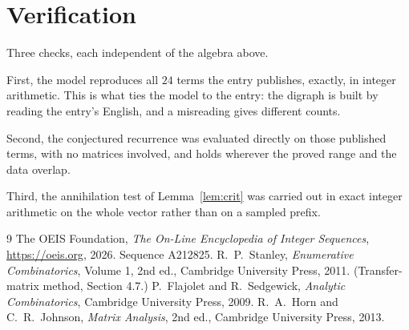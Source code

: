 \documentclass[11pt,a4paper]{article}
\theoremstyle{plain}
\theoremstyle{definition}
\begin{document}
\section{Verification}

Three checks, each independent of the algebra above.

First, the model reproduces all $24$ terms the entry publishes, exactly, in integer
arithmetic. This is what ties the model to the entry: the digraph is built by reading the
entry's English, and a misreading gives different counts.

Second, the conjectured recurrence was evaluated directly on those published terms, with no
matrices involved, and holds wherever the proved range and the data overlap.

Third, the annihilation test of Lemma~\ref{lem:crit} was carried out in exact integer
arithmetic on the whole vector rather than on a sampled prefix.

\begin{thebibliography}{9}
 The OEIS Foundation, \emph{The On-Line Encyclopedia of Integer
Sequences}, \url{https://oeis.org}, 2026. Sequence A212825.
 R.~P.~Stanley, \emph{Enumerative Combinatorics}, Volume 1, 2nd ed.,
Cambridge University Press, 2011. (Transfer-matrix method, Section 4.7.)
 P.~Flajolet and R.~Sedgewick, \emph{Analytic Combinatorics}, Cambridge
University Press, 2009.
 R.~A.~Horn and C.~R.~Johnson, \emph{Matrix Analysis}, 2nd ed., Cambridge
University Press, 2013.
\end{thebibliography}
\end{document}
